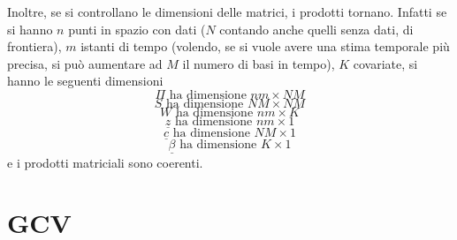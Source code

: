 \documentclass[a4paper,12pt]{report}				%
\begin{document}
Inoltre, se si controllano le dimensioni delle matrici, i prodotti tornano. Infatti se si hanno $n$ punti in spazio con dati ($N$ contando anche quelli senza dati, di frontiera), $m$ istanti di tempo (volendo, se si vuole avere una stima temporale più precisa, si può aumentare ad $M$ il numero di basi in tempo), $K$
covariate, si hanno le seguenti dimensioni
$$
\Pi \mbox{ ha dimensione } nm \times NM
$$
$$
S \mbox{ ha dimensione } NM \times NM
$$
$$
W \mbox{ ha dimensione } nm \times K
$$
$$
\underline{z} \mbox{ ha dimensione } nm \times 1
$$
$$
\underline{c} \mbox{ ha dimensione } NM \times 1
$$
$$
\underline{\beta} \mbox{ ha dimensione } K \times 1
$$
e i prodotti matriciali sono coerenti.



\chapter{GCV}
\end{document}
